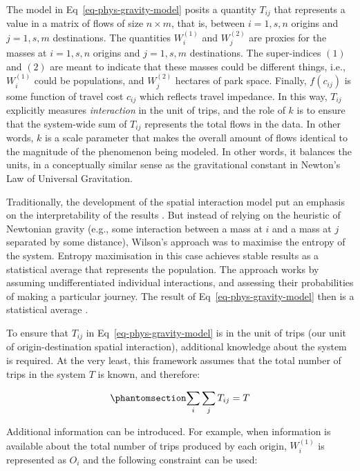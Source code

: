 \documentclass[
  10pt,
  letterpaper,
]{article}
\begin{document}
The model in Eq~\ref{eq-phys-gravity-model} posits a quantity \(T_{ij}\)
that represents a value in a matrix of flows of size \(n \times m\),
that is, between \(i = 1,s, n\) origins and \(j = 1,s, m\) destinations.
The quantities \(W_i^{(1)}\) and \(W_j^{(2)}\) are proxies for the
masses at \(i=1,s,n\) origins and \(j=1,s,m\) destinations. The
super-indices \((1)\) and \((2)\) are meant to indicate that these
masses could be different things, i.e., \(W_i^{(1)}\) could be
populations, and \(W_j^{(2)}\) hectares of park space. Finally,
\(f(c_{ij})\) is some function of travel cost \(c_{ij}\) which reflects
travel impedance. In this way, \(T_{ij}\) explicitly measures
\emph{interaction} in the unit of trips, and the role of \(k\) is to
ensure that the system-wide sum of \(T_{ij}\) represents the total flows
in the data. In other words, \(k\) is a scale parameter that makes the
overall amount of flows identical to the magnitude of the phenomenon
being modeled. In other words, it balances the units, in a conceptually
similar sense as the gravitational constant in Newton's Law of Universal
Gravitation.

Traditionally, the development of the spatial interaction model put an
emphasis on the interpretability of the results
\citep{kirbyNormalizingFactorsGravity1970, wilsonSTATISTICALTHEORYSPATIAL1967, wilson1971}.
But instead of relying on the heuristic of Newtonian gravity (e.g., some
interaction between a mass at \(i\) and a mass at \(j\) separated by
some distance), Wilson's approach was to maximise the entropy of the
system. Entropy maximisation in this case achieves stable results as a
statistical average that represents the population. The approach works
by assuming undifferentiated individual interactions, and assessing
their probabilities of making a particular journey. The result of
Eq~\ref{eq-phys-gravity-model} then is a statistical average
\citep{wilson1971, seniorGravityModellingEntropy1979}.

To ensure that \(T_{ij}\) in Eq~\ref{eq-phys-gravity-model} is in the
unit of trips (our unit of origin-destination spatial interaction),
additional knowledge about the system is required. At the very least,
this framework assumes that the total number of trips in the system
\(T\) is known, and therefore:

\begin{equation}\phantomsection\label{eq-constraint0-gravitymodel}{
\sum_i\sum_j T_{ij} = T
}\end{equation}

Additional information can be introduced. For example, when information
is available about the total number of trips produced by each origin,
\(W_i^{(1)}\) is represented as \(O_i\) and the following constraint can
be used:
\end{document}
